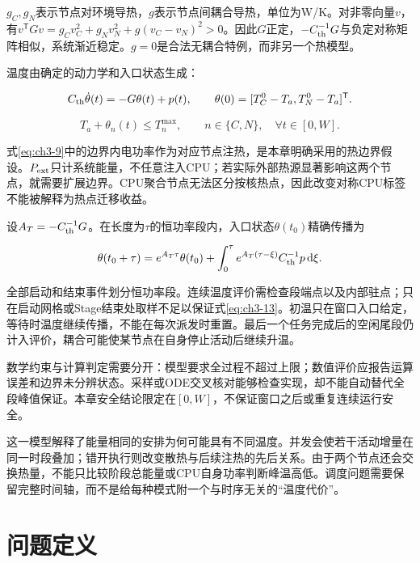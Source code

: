\(g_C,g_N\)表示节点对环境导热，\(g\)表示节点间耦合导热，单位为W/K。对非零向量\(v\)，有\(v^{\mathsf T}Gv=g_Cv_C^2+g_Nv_N^2+g(v_C-v_N)^2>0\)。因此\(G\)正定，\(-C_{\rm th}^{-1}G\)与负定对称矩阵相似，系统渐近稳定。\(g=0\)是合法无耦合特例，而非另一个热模型。

温度由确定的动力学和入口状态生成：

\begin{equation}
C_{\rm th}\dot\theta(t)=-G\theta(t)+p(t),\qquad
\theta(0)=[T_C^0-T_a,T_N^0-T_a]^{\mathsf T}.
\label{eq:ch3-12}
\end{equation}

\begin{equation}
T_a+\theta_n(t)\le T_n^{\max},\qquad n\in\{C,N\},\quad \forall t\in[0,W].
\label{eq:ch3-13}
\end{equation}

式\eqref{eq:ch3-9}中的边界内电功率作为对应节点注热，是本章明确采用的热边界假设。\(P_{\rm ext}\)只计系统能量，不任意注入CPU；若实际外部热源显著影响这两个节点，就需要扩展边界。CPU聚合节点无法区分按核热点，因此改变对称CPU标签不能被解释为热点迁移收益。

设\(A_T=-C_{\rm th}^{-1}G\)。在长度为\(\tau\)的恒功率段内，入口状态\(\theta(t_0)\)精确传播为

\begin{equation}
\theta(t_0+\tau)=e^{A_T\tau}\theta(t_0)
+\int_0^\tau e^{A_T(\tau-\xi)}C_{\rm th}^{-1}p\,\mathrm d\xi.
\label{eq:ch3-14}
\end{equation}

全部启动和结束事件划分恒功率段。连续温度评价需检查段端点以及内部驻点；只在启动网格或Stage结束处取样不足以保证式\eqref{eq:ch3-13}。初温只在窗口入口给定，等待时温度继续传播，不能在每次派发时重置。最后一个任务完成后的空闲尾段仍计入评价，耦合可能使某节点在自身停止活动后继续升温。

数学约束与计算判定需要分开：模型要求全过程不超过上限；数值评价应报告运算误差和边界未分辨状态。采样或ODE交叉核对能够检查实现，却不能自动替代全段峰值保证。本章安全结论限定在\([0,W]\)，不保证窗口之后或重复连续运行安全。


这一模型解释了能量相同的安排为何可能具有不同温度。并发会使若干活动增量在同一时段叠加；错开执行则改变散热与后续注热的先后关系。由于两个节点还会交换热量，不能只比较阶段总能量或CPU自身功率判断峰温高低。调度问题需要保留完整时间轴，而不是给每种模式附一个与时序无关的“温度代价”。

\section{问题定义}

